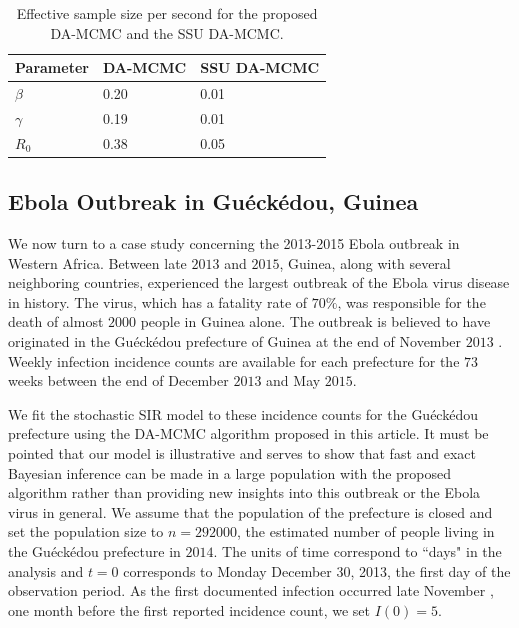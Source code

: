 \documentclass[11pt]{article}
\begin{document}
	 \begin{table}
        \centering
        \begin{tabular}{ C{2cm}| *{2}{C{3cm}}}
            Parameter & DA-MCMC & SSU DA-MCMC \\ 
            \hline
            $\beta$ & 0.20 & 0.01 \\ 
            $\gamma$ & 0.19 & 0.01 \\ 
            $R_0$ & 0.38 & 0.05 \\
            \hline
        \end{tabular}
        \caption{Effective sample size per second for the proposed DA-MCMC and the SSU DA-MCMC.}
        \label{tab:E6}
    \end{table}
	
	\subsection{Ebola Outbreak in Gu\'eck\'edou, Guinea}
	\label{sec:ebo}
	
	We now turn to a case study concerning the 2013-2015 Ebola outbreak in Western Africa.
	Between late $2013$ and $2015$, Guinea, along with several neighboring countries, experienced the largest outbreak of the Ebola virus disease in history. The virus, which has a fatality rate of $70\%$, was responsible for the death of almost $2000$ people in Guinea alone.
	The outbreak is believed to have originated in the Gu\'eck\'edou prefecture of Guinea at the end of November $2013$ \cite{Baize.2014}. Weekly infection incidence counts are available for each prefecture for the $73$ weeks between the end of December $2013$ and May $2015$.
	
	We fit the stochastic SIR model to these incidence counts for the Gu\'eck\'edou prefecture using the DA-MCMC algorithm proposed in this article.
	It must be pointed that our model is illustrative and serves to show that fast and exact Bayesian inference can be made in a large population with the proposed algorithm rather than providing new insights into this outbreak or the Ebola virus in general. We assume that the population of the prefecture is closed and set the population size to $n = 292000$, the estimated number of people living in the Gu\'eck\'edou prefecture in $2014$.
	The units of time correspond to ``days" in the analysis and $t=0$ corresponds to Monday December 30, 2013, the first day of the observation period.
	As the first documented infection occurred late November \cite{Baize.2014}, one month before the first reported incidence count, we set $I(0) = 5$.
	
\end{document}
